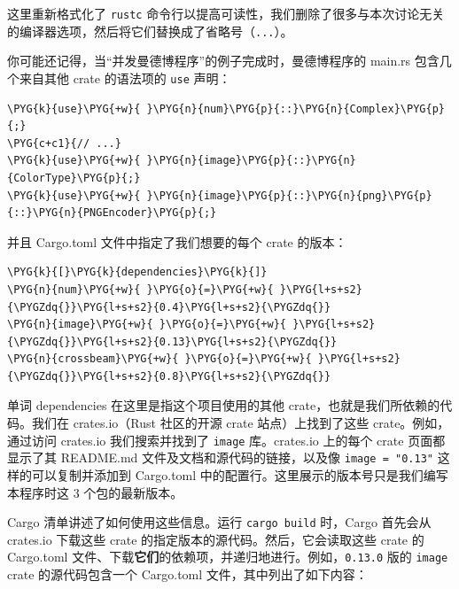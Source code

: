 这里重新格式化了 \texttt{rustc} 命令行以提高可读性，我们删除了很多与本次讨论无关的编译器选项，然后将它们替换成了省略号（\texttt{...}）。

你可能还记得，当“并发曼德博程序”的例子完成时，曼德博程序的 main.rs 包含几个来自其他 crate 的语法项的 \texttt{use} 声明：

\begin{Verbatim}[commandchars=\\\{\},breaklines=true,breakanywhere=true,fontsize=\codefont,xleftmargin=17bp]
\PYG{k}{use}\PYG{+w}{ }\PYG{n}{num}\PYG{p}{::}\PYG{n}{Complex}\PYG{p}{;}
\PYG{c+c1}{// ...}
\PYG{k}{use}\PYG{+w}{ }\PYG{n}{image}\PYG{p}{::}\PYG{n}{ColorType}\PYG{p}{;}
\PYG{k}{use}\PYG{+w}{ }\PYG{n}{image}\PYG{p}{::}\PYG{n}{png}\PYG{p}{::}\PYG{n}{PNGEncoder}\PYG{p}{;}
\end{Verbatim}

并且 Cargo.toml 文件中指定了我们想要的每个 crate 的版本：

\begin{Verbatim}[commandchars=\\\{\},breaklines=true,breakanywhere=true,fontsize=\codefont,xleftmargin=17bp]
\PYG{k}{[}\PYG{k}{dependencies}\PYG{k}{]}
\PYG{n}{num}\PYG{+w}{ }\PYG{o}{=}\PYG{+w}{ }\PYG{l+s+s2}{\PYGZdq{}}\PYG{l+s+s2}{0.4}\PYG{l+s+s2}{\PYGZdq{}}
\PYG{n}{image}\PYG{+w}{ }\PYG{o}{=}\PYG{+w}{ }\PYG{l+s+s2}{\PYGZdq{}}\PYG{l+s+s2}{0.13}\PYG{l+s+s2}{\PYGZdq{}}
\PYG{n}{crossbeam}\PYG{+w}{ }\PYG{o}{=}\PYG{+w}{ }\PYG{l+s+s2}{\PYGZdq{}}\PYG{l+s+s2}{0.8}\PYG{l+s+s2}{\PYGZdq{}}
\end{Verbatim}

单词 dependencies 在这里是指这个项目使用的其他 crate，也就是我们所依赖的代码。我们在 crates.io（Rust 社区的开源 crate 站点）上找到了这些 crate。例如，通过访问 crates.io 我们搜索并找到了 \texttt{image} 库。crates.io 上的每个 crate 页面都显示了其 README.md 文件及文档和源代码的链接，以及像 \texttt{image = "0.13"} 这样的可以复制并添加到 Cargo.toml 中的配置行。这里展示的版本号只是我们编写本程序时这 3 个包的最新版本。

Cargo 清单讲述了如何使用这些信息。运行 \texttt{cargo build} 时，Cargo 首先会从 crates.io 下载这些 crate 的指定版本的源代码。然后，它会读取这些 crate 的 Cargo.toml 文件、下载\textbf{它们}的依赖项，并递归地进行。例如，\texttt{0.13.0} 版的 \texttt{image} crate 的源代码包含一个 Cargo.toml 文件，其中列出了如下内容：


